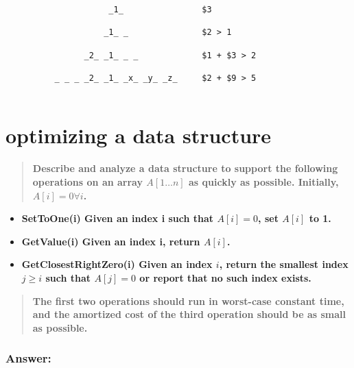\documentclass[titlepage]{article}\usepackage[]{graphicx}\usepackage[]{color}
\begin{document}
\begin{verbatim}
                     _1_                $3  

                    _1_ _               $2 > 1

                _2_ _1_ _ _             $1 + $3 > 2

          _ _ _ _2_ _1_ _x_ _y_ _z_     $2 + $9 > 5
            
\end{verbatim}

\section{optimizing a data structure}
\begin{quote}
  \textbf{Describe and analyze a data structure to support the following
	operations on an array $A[1\dots n]$ as quickly as possible. Initially, $A[i]
  = 0 \forall i$.}
\end{quote}

\begin{itemize}
  \item \textbf{SetToOne(i) Given an index i such that $A[i] = 0$, set $A[i]$ to 1.}
  \item \textbf{GetValue(i) Given an index i, return $A[i]$. }
  \item \textbf{GetClosestRightZero(i) Given an index $i$, return the smallest
	index $j \geq i$ such that $A[j] = 0$ or report that no such index exists.}
\end{itemize}
\begin{quote}
  \textbf{The first two operations should run in worst-case constant time, and
  the amortized cost of the third operation should be as small as possible.}
\end{quote}

\subsubsection{Answer: }
\end{document}
